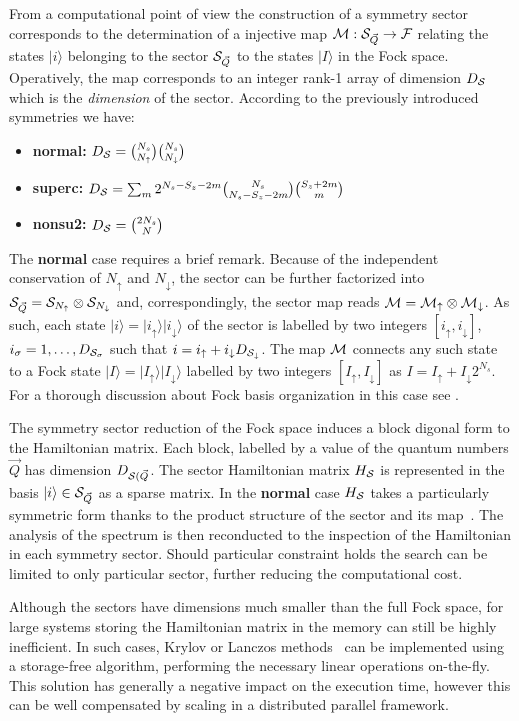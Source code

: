 \documentclass[final,3p,10pt]{elsarticle}
\newcommand{\onlinecite}[1]{\nocite{#1}\hspace{-0.1cm}\citenum{#1}}
\newcommand{\ket}[1]
{|#1\rangle}
\def\up{\uparrow} \def\down{\downarrow} \def\dw{\downarrow}
\begin{document}
From a computational point of view the construction of a symmetry
sector corresponds to the determination of a injective map
${\cal M}:{\cal S}_{\vec{Q}}\rightarrow {\cal F}$ relating the states $\ket{i}$
belonging to the sector ${\cal S}_{\vec{Q}}$ to the states $\ket{I}$ in the
Fock space. Operatively, the map corresponds to an integer rank-1
array of dimension $D_{\cal S}$ which is the {\it dimension} of the
sector. According to the previously introduced symmetries we
have:
\begin{itemize}
\item{\bf normal:}  $D_\SS = \binom{N_s}{N_\up}\binom{N_s}{N_\dw}$ 
\item{\bf superc:}  $D_{\cal S} = \sum_m 2^{N_s-S_z-2m}\binom{N_s}{N_s-S_z-2m}\binom{S_z+2m}{m}$
\item{\bf nonsu2:} $D_{\cal S}=\binom{2N_s}{N}$
\end{itemize}

The {\bf normal} case requires a brief remark. Because of the
independent conservation of $N_\up$ and $N_\dw$, the sector can be further factorized into $\SS_{\vec{Q}} = \SS_{N_\up}\otimes
\SS_{N_\dw}$ and, correspondingly, the sector map reads $\MM = \MM_\up
\otimes \MM_\dw$.
As such, each state $\ket{i}=\ket{i_\up}\ket{i_\dw}$ of the
sector is labelled by two integers $[i_\up,i_\dw]$, 
$i_\sigma=1,\dots,D_{{\cal S}_\sigma}$ such that $i=i_\up + i_\dw
D_{\SS_\dw}$. The map ${\cal M}$ connects any such state to a Fock state
$\ket{I}=\ket{I_\up}\ket{I_\dw}$ labelled by two integers
$[I_\up,I_\dw]$ as $I=I_\up +   I_\dw 2^{N_s}$. For a thorough
discussion about Fock basis organization in this case see
\onlinecite{amaricci2022}. 



The symmetry sector reduction of the Fock space induces a block
digonal form to the Hamiltonian matrix. Each block, labelled by a
value of the quantum numbers $\vec{Q}$ has dimension
$D_{{\cal S}(\vec{Q}}$. The sector Hamiltonian matrix $H_{\cal S}$ is represented in the
basis $\ket{i}\in\SS_{\vec{Q}}$ as a sparse matrix. In the {\bf
  normal} case $H_{\cal S}$ takes a particularly symmetric form thanks to
the product structure of the sector and its map~\cite{amaricci2022}.
The analysis of the spectrum is then reconducted to the inspection of
the Hamiltonian in each symmetry sector. Should particular constraint
holds the search can be limited to only particular sector, further
reducing the computational cost. 

Although the sectors have dimensions much smaller than the full Fock
space, for large systems storing the Hamiltonian matrix in the memory
can still be highly inefficient.
In such cases, Krylov or Lanczos methods~\cite{Lanczos1950JRNBSB,Lin1993CIP,Lehoucq1998,Maschhoff1996} can
be implemented using a storage-free algorithm, performing the
necessary linear operations on-the-fly.
This solution has generally a negative impact on the execution
time, however this can be well compensated by scaling in a distributed 
parallel framework.
\end{document}
